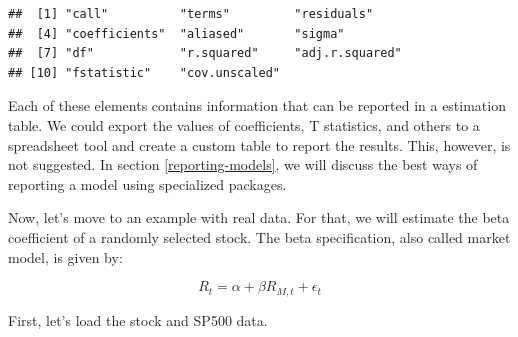 \documentclass[11pt,]{book}
\newenvironment{Shaded}{\begin{snugshade}}{\end{snugshade}}
\newcommand{\KeywordTok}[1]{\textcolor[rgb]{0.27,0.27,0.27}{\textbf{#1}}}
\newcommand{\DataTypeTok}[1]{\textcolor[rgb]{0.27,0.27,0.27}{#1}}
\newcommand{\DecValTok}[1]{\textcolor[rgb]{0.06,0.06,0.06}{#1}}
\newcommand{\StringTok}[1]{\textcolor[rgb]{0.5,0.5,0.5}{#1}}
\newcommand{\CommentTok}[1]{\textcolor[rgb]{0.56,0.35,0.01}{\textit{#1}}}
\newcommand{\OperatorTok}[1]{\textcolor[rgb]{0.81,0.36,0.00}{\textbf{#1}}}
\newcommand{\NormalTok}[1]{#1}
\begin{document}
\begin{verbatim}
##  [1] "call"          "terms"         "residuals"    
##  [4] "coefficients"  "aliased"       "sigma"        
##  [7] "df"            "r.squared"     "adj.r.squared"
## [10] "fstatistic"    "cov.unscaled"
\end{verbatim}

Each of these elements contains information that can be reported in a
estimation table. We could export the values of coefficients, T
statistics, and others to a spreadsheet tool and create a custom table
to report the results. This, however, is not suggested. In section
\ref{reporting-models}, we will discuss the best ways of reporting a
model using specialized packages.

Now, let's move to an example with real data. For that, we will estimate
the beta coefficient of a randomly selected stock. The beta
specification, also called market model, is given by:

\[ R _t = \alpha + \beta R_{M,t} + \epsilon _t\]

First, let's load the stock and SP500 data. 

\begin{Shaded}
\end{Shaded}
\end{document}
